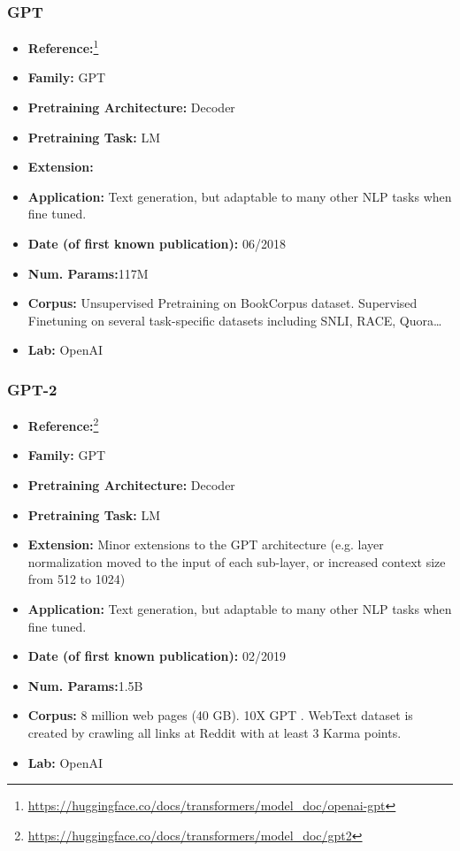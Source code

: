 \documentclass{article}
\begin{document}
\subsubsection{GPT}

            \begin{itemize}
                \item \textbf{Reference:}\footnote{\url{https://huggingface.co/docs/transformers/model_doc/openai-gpt}}\cite{radford2018improving}
                \item \textbf{Family:} GPT 
                \item \textbf{Pretraining Architecture:} Decoder
                \item \textbf{Pretraining Task:} LM
                \item \textbf{Extension:}   
                \item \textbf{Application:} Text generation, but adaptable to many other NLP tasks when fine tuned.
                \item \textbf{Date (of first known publication):} 06/2018
                \item \textbf{Num. Params:}117M
                \item \textbf{Corpus:} Unsupervised Pretraining on BookCorpus dataset. Supervised Finetuning on several task-specific datasets including SNLI, RACE, Quora…
                \item \textbf{Lab:} OpenAI
            \end{itemize}

\subsubsection{GPT-2}

            \begin{itemize}
                \item \textbf{Reference:}\footnote{\url{https://huggingface.co/docs/transformers/model_doc/gpt2}}\cite{radford2019language}
                \item \textbf{Family:} GPT 
                \item \textbf{Pretraining Architecture:} Decoder
                \item \textbf{Pretraining Task:} LM
                \item \textbf{Extension:} Minor extensions to the GPT architecture (e.g. layer normalization moved to the input of each sub-layer, or increased context size from 512 to 1024)  
                \item \textbf{Application:} Text generation, but adaptable to many other NLP tasks when fine tuned.
                \item \textbf{Date (of first known publication):} 02/2019
                \item \textbf{Num. Params:}1.5B
                \item \textbf{Corpus:} 8 million web pages (40 GB). 10X GPT . WebText dataset is created by crawling all links at Reddit with at least 3 Karma points.
                \item \textbf{Lab:} OpenAI
            \end{itemize}   
\end{document}
